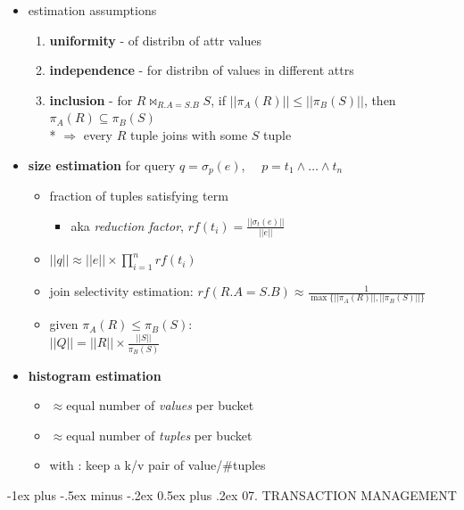 \documentclass[10pt, landscape]{article}
\makeatletter
\renewcommand{\section}{\@startsection{section}{1}{0mm}%
  {-1ex plus -.5ex minus -.2ex}%
  {0.5ex plus .2ex}%
{\normalfont\large\bfseries}}
\makeatother
\begin{document}
\begin{multicols*}{4}
  \begin{itemize}
    \item estimation assumptions
      \begin{enumerate}
        \item \textbf{uniformity} - of distribn of attr values
        \item \textbf{independence} - for distribn of values in different attrs
        \item \textbf{inclusion} - for $R \bowtie_{R.A=S.B}S$, if $||\pi_A(R)|| \leq ||\pi_B(S)||$, then $\pi_A(R) \subseteq \pi_B(S)$ 
          \\* $\Rightarrow$ every $R$ tuple joins with some $S$ tuple
      \end{enumerate}
    \item \textbf{size estimation} for query $q = \sigma_p(e)$,  $\quad p = t_1 \land \dots \land t_n$
      \begin{itemize}
        \item {} fraction of tuples satisfying term
          \begin{itemize}
            \item aka \textit{reduction factor}, $rf(t_i) = \frac{||\sigma_t(e)||}{||e||}$
          \end{itemize}
        \item $||q|| \approx ||e|| \times \prod^n_{i=1}rf(t_i)$
        \item join selectivity estimation: $rf(R.A=S.B) \approx \frac{1}{\max\{||\pi_A(R)||, ||\pi_B(S)||\}}$
        \item given $\pi_A(R) \leq \pi_B(S)$:\\$||Q|| = ||R|| \times\frac{||S||}{\pi_B(S)}$
      \end{itemize}
    \item \textbf{histogram estimation}
      \begin{itemize}
        \item {} $\approx$equal number of \textit{values} per bucket
        \item {} $\approx$equal number of \textit{tuples} per bucket
        \item with : keep a k/v pair of value/\#tuples
      \end{itemize}
  \end{itemize}

  \section{07. TRANSACTION MANAGEMENT}


\end{multicols*}
\end{document}
